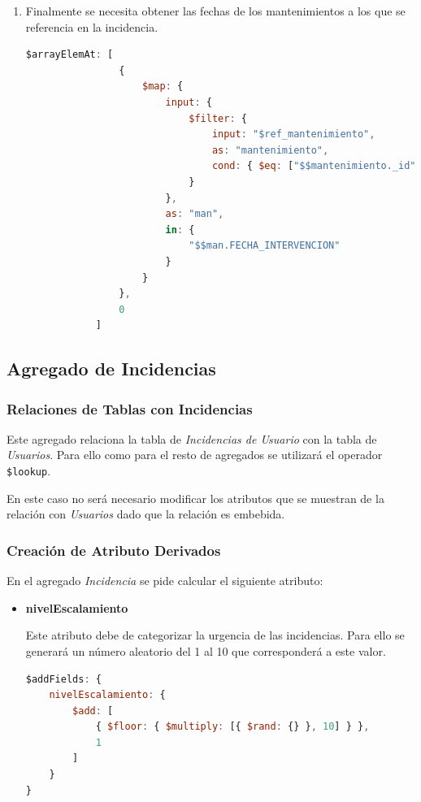 \documentclass[]{article}
\begin{document}
\begin{itemize}
\begin{enumerate}
        \item Finalmente se necesita obtener las fechas de los mantenimientos a los que se referencia en la incidencia.
        
        \begin{lstlisting}[language=JavaScript, caption=Obtención de fechas de mantenimiento relacionadas con la incidencia]
$arrayElemAt: [
                {
                    $map: {
                        input: {
                            $filter: {
                                input: "$ref_mantenimiento",
                                as: "mantenimiento",
                                cond: { $eq: ["$$mantenimiento._id", "$$mantenimiento_id"] }
                            }
                        },
                        as: "man",
                        in: {
                            "$$man.FECHA_INTERVENCION"
                        }
                    }
                },
                0
            ]
        \end{lstlisting}
    \end{enumerate}
\end{itemize}

\subsection{Agregado de Incidencias}
\label{subsec:agregado_incidencias}

\subsubsection{Relaciones de Tablas con Incidencias}
\label{subsubsec:relaciones_incidencias}

Este agregado relaciona la tabla de \textit{Incidencias de Usuario} con la tabla de \textit{Usuarios}. Para ello como para el resto de agregados se utilizará el operador \texttt{\$lookup}.

En este caso no será necesario modificar los atributos que se muestran de la relación con \textit{Usuarios} dado que la relación es embebida.

\subsubsection{Creación de Atributo Derivados}
\label{subsubsec:derivados_incidencias}

En el agregado \textit{Incidencia} se pide calcular el siguiente atributo:
\begin{itemize}
    \item \textbf{nivelEscalamiento}
    
    Este atributo debe de categorizar la urgencia de las incidencias. Para ello se generará un número aleatorio del 1 al 10 que corresponderá a este valor.

    \begin{lstlisting}[language=JavaScript, caption={Cálculo de nivelEscalamiento}]
$addFields: {
    nivelEscalamiento: {
        $add: [
            { $floor: { $multiply: [{ $rand: {} }, 10] } },
            1
        ]
    }
}
    \end{lstlisting}
\end{itemize}
\end{document}
